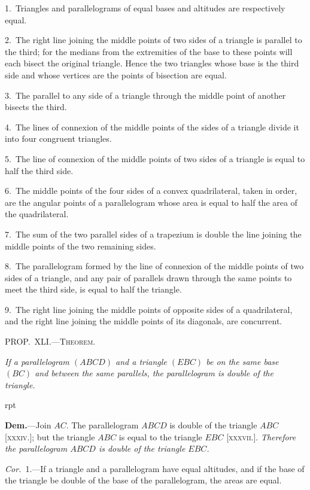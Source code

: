 \documentclass[oneside]{book}
\newcommand\mypropl[2]{
\bigskip\Needspace*{4\baselineskip}\begin{center}\textsc{#1}\end{center}
\hspace{\parindent}\emph{#2}\par\medskip
}
\newcommand\imgflow[3]{
\setcounter{wrapwidth}{#1}
\begin{wrapfigure}[#2]{r}{\value{wrapwidth}pt}
\begin{center}
\vspace{-0.3in}
\end{center}
\end{wrapfigure}
}
\begin{document}
\begin{footnotesize}
1.~Triangles and parallelograms of equal bases and altitudes
are respectively equal.

2.~The right line joining the middle points of two sides of a
triangle is parallel to the third; for the medians from the extremities
of the base to these points will each bisect the original
triangle. Hence the two triangles whose base is the third side
and whose vertices are the points of bisection are equal.

3.~The parallel to any side of a triangle through the middle
point of another bisects the third.

4.~The lines of connexion of the middle points of the sides of
a triangle divide it into four congruent triangles.

5.~The line of connexion of the middle points of two sides of
a triangle is equal to half the third side.

6.~The middle points of the four sides of a convex quadrilateral,
taken in order, are the angular points of a parallelogram whose
area is equal to half the area of the quadrilateral.

7.~The sum of the two parallel sides of a trapezium is double
the line joining the middle points of the two remaining sides.

8.~The parallelogram formed by the line of connexion of the
middle points of two sides of a triangle, and any pair of parallels
drawn through the same points to meet the third side, is equal to
half the triangle.

9.~The right line joining the middle points of opposite sides
of a quadrilateral, and the right line joining the middle points
of its diagonals, are concurrent.
\par\end{footnotesize}


\mypropl{PROP\@.~XLI\@.---Theorem.}{If a parallelogram $(ABCD)$ and a triangle $(EBC)$ be
on the same base $(BC)$ and between the same parallels, the
parallelogram is double of the triangle.}

\imgflow{128}{8}{f061}

\textbf{Dem.}---Join $AC$. The parallelogram $ABCD$ is double
of the triangle $ABC$ [\textsc{xxxiv}.];
but the triangle $ABC$ is equal
to the triangle $EBC$ [\textsc{xxxvii}.].
\emph{Therefore the parallelogram
$ABCD$ is double of the triangle
$EBC$.}

\textit{Cor.}~1.---If a triangle and
a parallelogram have equal altitudes, and if the base
of the triangle be double of the base of the parallelogram,
the areas are equal.
\end{document}
